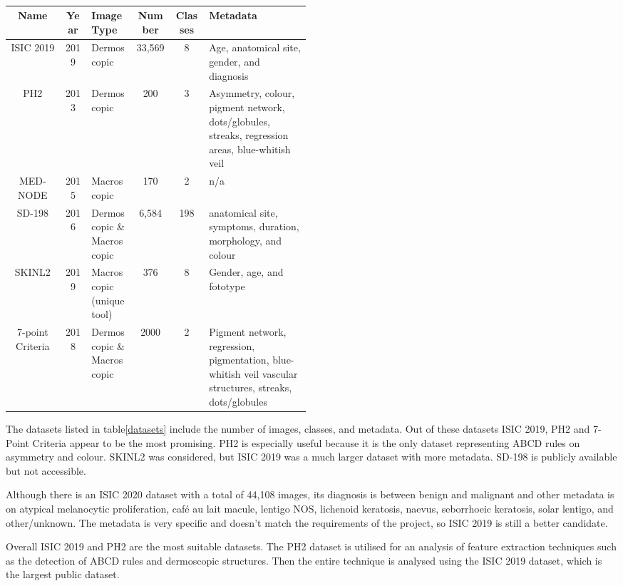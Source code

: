 \begin{table}
    \small
    \begin{tabular}{|c|c|p{0.15\linewidth}|c|c|p{0.34\linewidth}|}
        \hline
        Name & Year & Image Type & Number & Classes & Metadata \\
        \hline
        ISIC 2019 & 2019 & Dermoscopic & 33,569 & 8 & Age, anatomical site, gender, and diagnosis
        \\
        \hline
        PH2 & 2013 & Dermoscopic & 200 & 3 & Asymmetry, colour, pigment network, dots/globules, streaks, regression areas, blue-whitish veil
        \\
        \hline
        MED-NODE  & 2015 & Macroscopic & 170 & 2 & n/a
        \\
        \hline  
        SD-198  & 2016 & Dermoscopic \& Macroscopic & 6,584 & 198 & anatomical site, symptoms, duration, morphology, and colour
        \\
        \hline  
        SKINL2 & 2019 & Macroscopic (unique tool) & 376 & 8 & Gender, age, and fototype
        \\
        \hline
        7-point Criteria & 2018 & Dermoscopic \& Macroscopic & 2000 & 2 & Pigment network, regression, pigmentation, blue-whitish veil vascular structures, streaks, dots/globules
        \\
        \hline  
    \end{tabular}
    \caption{}
    \end{table} \label{datasets}

The datasets listed in table\ref{datasets} include the number of images, classes, and metadata. Out of these datasets ISIC 2019, PH2 and 7-Point Criteria appear to be the most promising. PH2 is especially useful because it is the only dataset representing ABCD rules on asymmetry and colour. SKINL2 was considered, but ISIC 2019 was a much larger dataset with more metadata. SD-198 is publicly available but not accessible.

Although there is an ISIC 2020 dataset with a total of 44,108 images, its diagnosis is between benign and malignant and other metadata is on atypical melanocytic proliferation, café au lait macule, lentigo NOS, lichenoid keratosis, naevus, seborrhoeic keratosis, solar lentigo, and other/unknown. The metadata is very specific and doesn't match the requirements of the project, so ISIC 2019 is still a better candidate.

Overall ISIC 2019 and PH2 are the most suitable datasets. The PH2 dataset is utilised for an analysis of feature extraction techniques such as the detection of ABCD rules and dermoscopic structures. Then the entire technique is analysed using the ISIC 2019 dataset, which is the largest public dataset.

